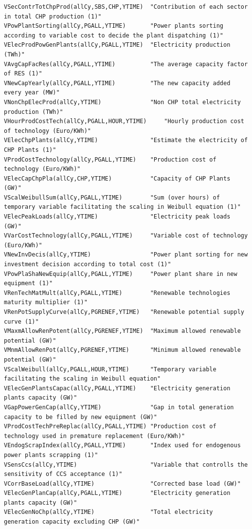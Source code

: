 \documentclass[a4paper,]{scrartcl}
\begin{document}
\begin{lstlisting}
VSecContrTotChpProd(allCy,SBS,CHP,YTIME)  "Contribution of each sector in total CHP production (1)" 
VPowPlantSorting(allCy,PGALL,YTIME)       "Power plants sorting according to variable cost to decide the plant dispatching (1)"
VElecProdPowGenPlants(allCy,PGALL,YTIME)  "Electricity production (TWh)"    
VAvgCapFacRes(allCy,PGALL,YTIME)          "The average capacity factor of RES (1)"
VNewCapYearly(allCy,PGALL,YTIME)          "The new capacity added every year (MW)"  
VNonChpElecProd(allCy,YTIME)              "Non CHP total electricity production (TWh)"              
VHourProdCostTech(allCy,PGALL,HOUR,YTIME)     "Hourly production cost of technology (Euro/KWh)"
VElecChpPlants(allCy,YTIME)               "Estimate the electricity of CHP Plants (1)"  
VProdCostTechnology(allCy,PGALL,YTIME)    "Production cost of technology (Euro/KWh)"
VElecCapChpPla(allCy,CHP,YTIME)           "Capacity of CHP Plants (GW)"
VScalWeibullSum(allCy,PGALL,YTIME)        "Sum (over hours) of temporary variable facilitating the scaling in Weibull equation (1)"
VElecPeakLoads(allCy,YTIME)               "Electricity peak loads (GW)" 
VVarCostTechnology(allCy,PGALL,YTIME)     "Variable cost of technology (Euro/KWh)"  
VNewInvDecis(allCy,YTIME)                 "Power plant sorting for new investment decision according to total cost (1)" 
VPowPlaShaNewEquip(allCy,PGALL,YTIME)     "Power plant share in new equipment (1)"  
VRenTechMatMult(allCy,PGALL,YTIME)        "Renewable technologies maturity multiplier (1)"  
VRenPotSupplyCurve(allCy,PGRENEF,YTIME)   "Renewable potential supply curve (1)"
VMaxmAllowRenPotent(allCy,PGRENEF,YTIME)  "Maximum allowed renewable potential (GW)"
VMnmAllowRenPot(allCy,PGRENEF,YTIME)      "Minimum allowed renewable potential (GW)"        
VScalWeibull(allCy,PGALL,HOUR,YTIME)      "Temporary variable facilitating the scaling in Weibull equation" 
VElecGenPlantsCapac(allCy,PGALL,YTIME)    "Electricity generation plants capacity (GW)" 
VGapPowerGenCap(allCy,YTIME)              "Gap in total generation capacity to be filled by new equipment (GW)"     
VProdCostTechPreReplac(allCy,PGALL,YTIME) "Production cost of technology used in premature replacement (Euro/KWh)"
VEndogScrapIndex(allCy,PGALL,YTIME)       "Index used for endogenous power plants scrapping (1)"            
VSensCcs(allCy,YTIME)                     "Variable that controlls the sensitivity of CCS acceptance (1)"           
VCorrBaseLoad(allCy,YTIME)                "Corrected base load (GW)"
VElecGenPlanCap(allCy,PGALL,YTIME)        "Electricity generation plants capacity (GW)" 
VElecGenNoChp(allCy,YTIME)                "Total electricity generation capacity excluding CHP (GW)"    

\end{lstlisting}
\end{document}
